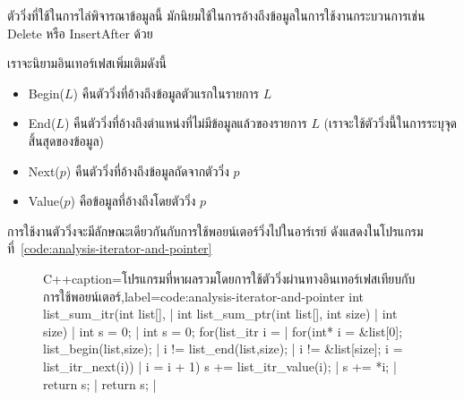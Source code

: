 ตัว{\wbr}วิ่ง{\wbr}ที่{\wbr}ใช้{\wbr}ใน{\wbr}การ{\wbr}ไล่{\wbr}พิจารณา{\wbr}ข้อมูล{\wbr}นี้ มัก{\wbr}นิยม{\wbr}ใช้{\wbr}ใน{\wbr}การ{\wbr}อ้าง{\wbr}ถึง{\wbr}ข้อมูล{\wbr}ใน{\wbr}การ{\wbr}ใช้{\wbr}งาน{\wbr}กระบวนการ{\wbr}เช่น{\wbr}
Delete หรือ InsertAfter ด้วย{\wbr}

เรา{\wbr}จะ{\wbr}นิยาม{\wbr}อิน{\wbr}เทอร์เฟส{\wbr}เพิ่มเติม{\wbr}ดังนี้{\wbr}
\begin{itemize}
\item Begin($L$) คืนตัว{\wbr}วิ่ง{\wbr}ที่{\wbr}อ้าง{\wbr}ถึง{\wbr}ข้อมูล{\wbr}ตัว{\wbr}แรก{\wbr}ใน{\wbr}รายการ $L$
\item End($L$) คืนตัว{\wbr}วิ่ง{\wbr}ที่{\wbr}อ้าง{\wbr}ถึง{\wbr}ตำแหน่ง{\wbr}ที่{\wbr}ไม่{\wbr}มี{\wbr}ข้อมูล{\wbr}แล้ว{\wbr}ของ{\wbr}รายการ $L$
  (เรา{\wbr}จะ{\wbr}ใช้{\wbr}ตัว{\wbr}วิ่ง{\wbr}นี้{\wbr}ใน{\wbr}การ{\wbr}ระบุ{\wbr}จุดสิ้นสุด{\wbr}ของ{\wbr}ข้อมูล)
\item Next($p$) คืนตัว{\wbr}วิ่ง{\wbr}ที่{\wbr}อ้าง{\wbr}ถึง{\wbr}ข้อมูล{\wbr}ถัดจาก{\wbr}ตัว{\wbr}วิ่ง $p$
\item Value($p$) คือ{\wbr}ข้อมูล{\wbr}ที่{\wbr}อ้าง{\wbr}ถึง{\wbr}โดย{\wbr}ตัว{\wbr}วิ่ง $p$
\end{itemize}

การ{\wbr}ใช้{\wbr}งาน{\wbr}ตัว{\wbr}วิ่ง{\wbr}จะ{\wbr}มี{\wbr}ลักษณะ{\wbr}เดียวกัน{\wbr}กับ{\wbr}การ{\wbr}ใช้{\wbr}พอยน์เตอร์{\wbr}วิ่ง{\wbr}ไป{\wbr}ใน{\wbr}อาร์เรย์ ดัง{\wbr}แสดง{\wbr}ใน{\wbr}โปรแกรม{\wbr}ที่~\ref{code:analysis-iterator-and-pointer}

\begin{figure}
\latintext
\begin{codelist}{C++}{caption={\thaitext โปรแกรม{\wbr}ที่{\wbr}หา{\wbr}ผลรวม{\wbr}โดย{\wbr}การ{\wbr}ใช้{\wbr}ตัว{\wbr}วิ่ง{\wbr}ผ่าน{\wbr}ทาง{\wbr}อิน{\wbr}เทอร์เฟส{\wbr}เทียบ{\wbr}กับ{\wbr}การ{\wbr}ใช้{\wbr}พอยน์เตอร์\latintext},label=code:analysis-iterator-and-pointer}
int list_sum_itr(int list[],      | int list_sum_ptr(int list[],
                 int size)        |                  int size)
{                                 | {
  int s = 0;                      |   int s = 0;
  for(list_itr i =                |   for(int* i = &list[0];
        list_begin(list,size);    | 
      i != list_end(list,size);   |       i != &list[size];
      i = list_itr_next(i)) {     |       i = i + 1) {
    s += list_itr_value(i);       |     s += *i;
  }                               |   }
  return s;                       |   return s;
}                                 | }
\end{codelist}
\thaitext
\end{figure}


